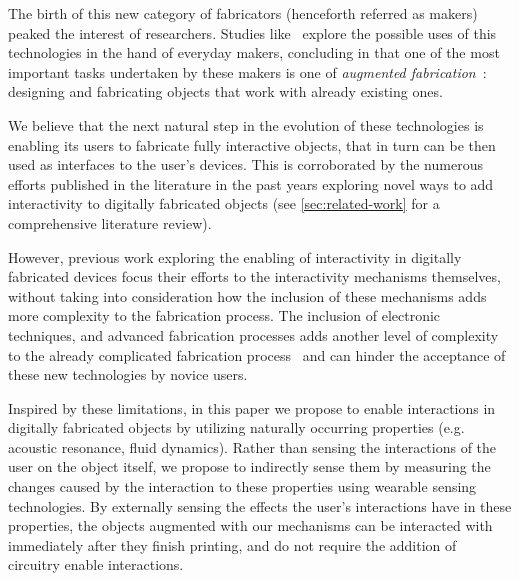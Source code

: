     The birth of this new category of fabricators (henceforth referred as
    makers) peaked the interest of researchers. Studies
    like~\cite{Shewbridge:2014gl} explore the possible uses of this
    technologies in the hand of everyday makers, concluding in that one of the
    most important tasks undertaken by these makers is one of \emph{augmented
    fabrication}~\cite{Ashbrook:2016fga}: designing and fabricating objects
    that work with already existing ones. 
    
    We believe that the next natural step in the evolution of these
    technologies is enabling its users to fabricate fully interactive objects,
    that in turn can be then used as interfaces to the user's devices. This
    is corroborated by the numerous efforts published in the literature in the
    past years exploring novel ways to add interactivity to digitally
    fabricated objects (see \cref{sec:related-work} for a comprehensive
    literature review).
    
    However, previous work exploring the enabling of interactivity in digitally
    fabricated devices focus their efforts to the interactivity mechanisms
    themselves, without taking into consideration how the inclusion of these
    mechanisms adds more complexity to the fabrication process. The inclusion of
    electronic techniques, and advanced fabrication processes adds another
    level of complexity to the already complicated fabrication
    process~\cite{Hudson:2016hi, Mellis:2012ba, Weichel:2014ed} and can hinder
    the acceptance of these new technologies by novice users.
    
    Inspired by these limitations, in this paper we propose to enable
    interactions in digitally fabricated objects by utilizing naturally
    occurring properties (e.g. acoustic resonance, fluid dynamics). Rather than sensing
    the interactions of the user on the object itself, we propose to indirectly
    sense them by measuring the changes caused by the interaction to these
    properties using wearable sensing technologies. By externally sensing the
    effects the user's interactions have in these properties, the objects
    augmented with our mechanisms can be interacted with immediately after they
    finish printing, and do not require the addition of circuitry enable
    interactions.

